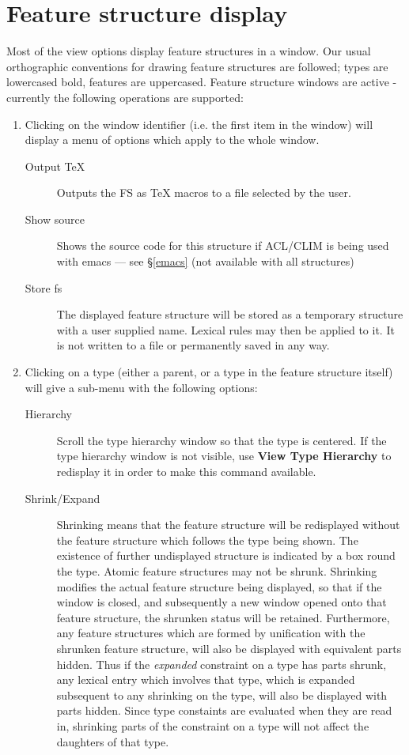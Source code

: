 \documentclass[12pt]{report}
\begin{document}
\section{Feature structure display}
\label{activefs}

Most of the view options display feature structures in a window.  
Our usual orthographic conventions for
drawing feature structures are followed; types are lowercased bold,
features are uppercased.  Feature structure windows
are active - currently the following operations are supported:
\begin{enumerate}
\item Clicking on the window identifier (i.e. the first item in the
window) will display a menu of options which apply to the whole
window.
\begin{description}
\item [Output TeX] Outputs the FS as TeX macros to a file selected by
the user.  
\item [Show source] Shows the source code for this structure 
if ACL/CLIM is being used with emacs --- see \S\ref{emacs}
(not available with all structures)
\item [Store fs] The displayed feature structure will be stored as a
temporary structure with a user supplied name.  Lexical rules may then be
applied to it.
It is not written to a file or permanently saved in
any way.
\end{description}
\item Clicking on a type (either a parent, or a type in the feature
structure itself) will give a sub-menu with the following options:
\begin{description}
\item[Hierarchy] Scroll the type hierarchy window so
that the type is centered.  If the type hierarchy window is not visible,
use {\bf View Type Hierarchy} to redisplay it in order to make
this command available.
\item[Shrink/Expand] 
Shrinking means that the feature structure will be redisplayed without
the feature structure which follows the type being shown.  The
existence of further undisplayed structure is indicated by a box round
the type.  Atomic feature structures may not be shrunk.  Shrinking
modifies the actual feature structure being displayed, so that if the
window is closed, and subsequently a new window opened onto that
feature structure, the shrunken status will be retained.  Furthermore,
any feature structures which are formed by unification with the
shrunken feature structure, will also be displayed with equivalent
parts hidden.  Thus if the {\em expanded} constraint on a type has
parts shrunk, any lexical entry which involves that type, which is
expanded subsequent to any shrinking on the type, will also be
displayed with parts hidden.  Since type constaints 
are evaluated when they are
read in, shrinking parts of the constraint on a type will not affect
the daughters of that type.


\end{description}
\end{enumerate}
\end{document}
